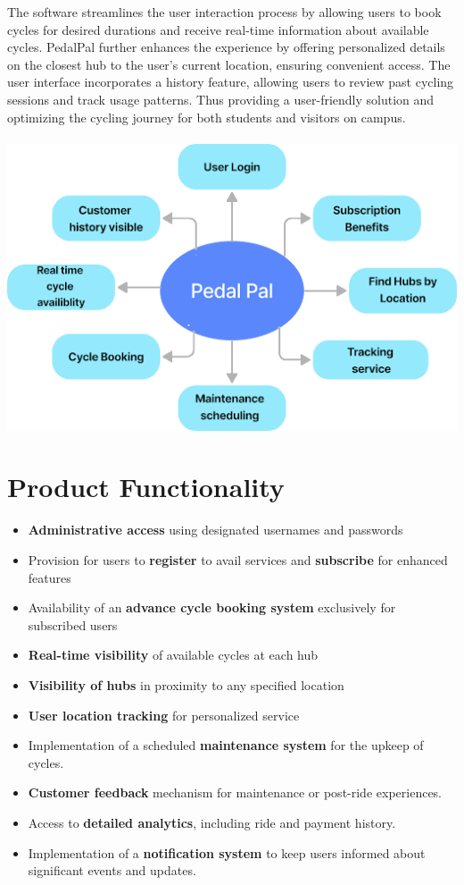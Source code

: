 \documentclass{scrreprt}
\begin{document}
The software streamlines the user interaction process by allowing users to book cycles for desired durations and receive real-time information about available cycles. PedalPal further enhances the experience by offering personalized details on the closest hub to the user's current location, ensuring convenient access. The user interface incorporates a history feature, allowing users to review past cycling sessions and track usage patterns. Thus providing a user-friendly solution and optimizing the cycling journey for both students and visitors on campus.
\\
\\
\includegraphics[scale=0.9]{Overview.png}

\section{Product Functionality}
\begin{itemize}
    \item \textbf{Administrative access} using designated usernames and passwords
    \item Provision for users to \textbf{register} to avail services and \textbf{subscribe} for enhanced features
    \item Availability of an \textbf{advance cycle booking system} exclusively for subscribed users
    \item \textbf{Real-time visibility} of available cycles at each hub
    \item \textbf{Visibility of hubs} in proximity to any specified location
    \item \textbf{User location tracking} for personalized service
    \item Implementation of a scheduled \textbf{maintenance system} for the upkeep of cycles.
    \item \textbf{Customer feedback} mechanism for maintenance or post-ride experiences.
    \item Access to \textbf{detailed analytics}, including ride and payment history.
    \item Implementation of a \textbf{notification system} to keep users informed about significant events and updates.

\end{itemize}
\end{document}
